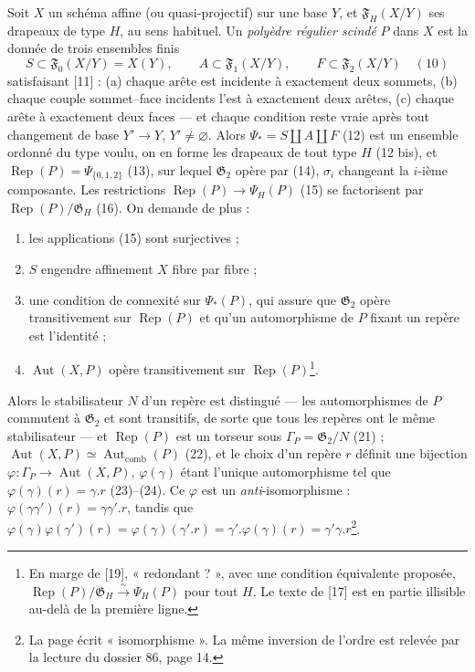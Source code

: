 \documentclass[11pt,a4paper]{article}
\begin{document}
Soit $X$ un schéma affine (ou quasi-projectif) sur une base $Y$, et
$\mathfrak{F}_H(X/Y)$ ses drapeaux de type $H$, au sens habituel. Un
\emph{polyèdre régulier scindé} $P$ dans $X$ est la donnée de trois ensembles
finis
\[
S \subset \mathfrak{F}_0(X/Y) = X(Y), \qquad A \subset \mathfrak{F}_1(X/Y), \qquad F
\subset \mathfrak{F}_2(X/Y) \quad (10)
\]
satisfaisant [11] : (a) chaque arête est incidente à exactement deux
sommets, (b) chaque couple sommet--face incidents l'est à exactement deux
arêtes, (c) chaque arête à exactement deux faces --- et chaque condition reste
vraie après tout changement de base $Y' \to Y$, $Y' \neq \varnothing$. Alors
$\Psi_* = S \amalg A \amalg F$ (12) est un ensemble ordonné du type voulu, on en
forme les drapeaux de tout type $H$ (12 bis), et $\operatorname{Rep}(P) =
\Psi_{\{0,1,2\}}$ (13), sur lequel $\mathfrak{G}_2$ opère par (14), $\sigma_i$
changeant la $i$-ième composante. Les restrictions $\operatorname{Rep}(P) \to
\Psi_H(P)$ (15) se factorisent par $\operatorname{Rep}(P)/\mathfrak{G}_H$ (16). On
demande de plus :
\begin{enumerate}
  \item[{[17]}] les applications (15) sont surjectives ;
  \item[{[18]}] $S$ engendre affinement $X$ fibre par fibre ;
  \item[{[19]}] une condition de connexité sur $\Psi_*(P)$, qui assure que
    $\mathfrak{G}_2$ opère transitivement sur $\operatorname{Rep}(P)$ et qu'un
    automorphisme de $P$ fixant un repère est l'identité ;
  \item[{[20]}] $\operatorname{Aut}(X, P)$ opère transitivement sur
    $\operatorname{Rep}(P)$\footnote{En marge de [19], « redondant ? », avec une
    condition équivalente proposée, $\operatorname{Rep}(P) / \mathfrak{G}_H
    \xrightarrow{\sim} \Psi_H(P)$ pour tout $H$. Le texte de [17] est en partie
    illisible au-delà de la première ligne.}.
\end{enumerate}
Alors le stabilisateur $N$ d'un repère est distingué --- les automorphismes de
$P$ commutent à $\mathfrak{G}_2$ et sont transitifs, de sorte que tous les
repères ont le même stabilisateur --- et $\operatorname{Rep}(P)$ est un torseur sous $\Gamma_P =
\mathfrak{G}_2 / N$ (21) ; $\operatorname{Aut}(X, P) \simeq
\operatorname{Aut}_{\mathrm{comb}}(P)$ (22), et le choix d'un repère $r$ définit
une bijection $\varphi : \Gamma_P \to \operatorname{Aut}(X, P)$, $\varphi(\gamma)$
étant l'unique automorphisme tel que $\varphi(\gamma)(r) = \gamma.r$ (23)--(24).
Ce $\varphi$ est un \emph{anti}-isomorphisme : $\varphi(\gamma\gamma')(r) =
\gamma\gamma'.r$, tandis que $\varphi(\gamma)\varphi(\gamma')(r) =
\varphi(\gamma)(\gamma'.r) = \gamma'.\varphi(\gamma)(r) = \gamma'\gamma.r$\footnote{La
page écrit « isomorphisme ». La même inversion de l'ordre est relevée par la
lecture du dossier 86, page 14.}.
\end{document}

